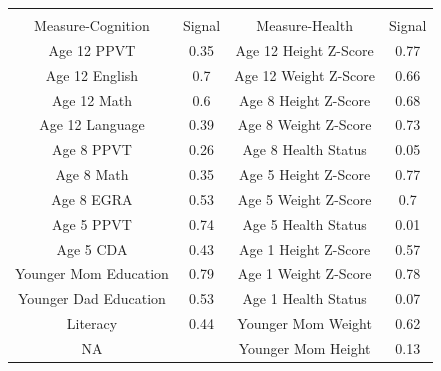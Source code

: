 \begin{table}  \begin{tabular}{@{\extracolsep{5pt}}cccc} \hline \tabularnewline 
Measure-Cognition & Signal & Measure-Health & Signal \\ 
  \hline
Age 12 PPVT & 0.35 & Age 12 Height Z-Score & 0.77 \\ 
  Age 12 English & 0.7 & Age 12 Weight Z-Score & 0.66 \\ 
  Age 12 Math & 0.6 & Age 8 Height Z-Score & 0.68 \\ 
  Age 12 Language & 0.39 & Age 8 Weight Z-Score & 0.73 \\ 
  Age 8 PPVT & 0.26 & Age 8 Health Status & 0.05 \\ 
  Age 8 Math & 0.35 & Age 5 Height Z-Score & 0.77 \\ 
  Age 8 EGRA & 0.53 & Age 5 Weight Z-Score & 0.7 \\ 
  Age 5 PPVT & 0.74 & Age 5 Health Status & 0.01 \\ 
  Age 5 CDA & 0.43 & Age 1 Height Z-Score & 0.57 \\ 
  Younger Mom Education & 0.79 & Age 1 Weight Z-Score & 0.78 \\ 
  Younger Dad Education & 0.53 & Age 1 Health Status & 0.07 \\ 
  Literacy & 0.44 & Younger Mom Weight & 0.62 \\ 
  NA &  & Younger Mom Height & 0.13 \\ 
   \hline

 \end{tabular} \end{table}
